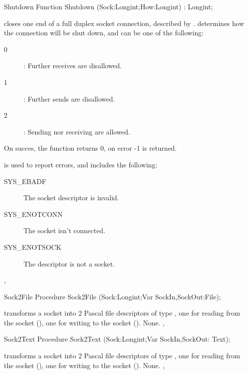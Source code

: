 \begin{function}{Shutdown}
\Declaration
Function Shutdown (Sock:Longint;How:Longint) : Longint;

\Description
{} closes one end of a full duplex socket connection, described
by .  determines how the connection will be shut down,
and can be one of the following:
\begin{description}
\item[0] : Further receives are disallowed.
\item[1] : Further sends are disallowed.
\item[2] : Sending nor receiving are allowed.
\end{description}
On succes, the function returns 0, on error -1 is returned.

\Errors
{} is used to report errors, and includes the following:
\begin{description}
\item[SYS\_EBADF] The socket descriptor is invalid.
\item[SYS\_ENOTCONN] The socket isn't connected.
\item[SYS\_ENOTSOCK] The descriptor is not a socket.
\end{description}

\SeeAlso
{}, 
\end{function}
\begin{procedure}{Sock2File}
\Declaration
Procedure Sock2File (Sock:Longint;Var SockIn,SockOut:File);

\Description
{} transforms a socket  into 2 Pascal file
descriptors of type , one for reading from the socket
(), one for writing to the socket ().
\Errors
None.
\SeeAlso
{}, 
\end{procedure}
\begin{procedure}{Sock2Text}
\Declaration
Procedure Sock2Text (Sock:Longint;Var SockIn,SockOut: Text);

\Description
{} transforms a socket  into 2 Pascal file
descriptors of type , one for reading from the socket
(), one for writing to the socket ().
\Errors
None.
\SeeAlso
{}, 
\end{procedure}
